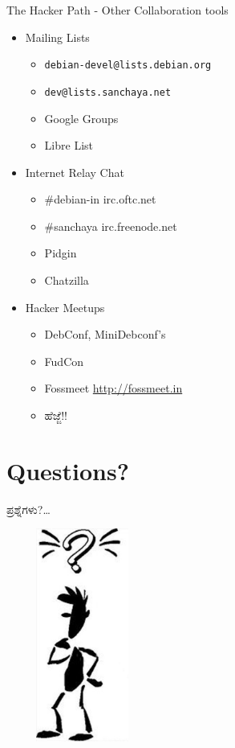 \documentclass[slidestop,compress,brown]{beamer}
\newcommand\en[1]{{\english #1}}
\begin{document}
\begin{frame}{\en{The Hacker Path - Other Collaboration tools}}
  \begin{itemize}[<+->]
  \item<+-| alert@+> \en{Mailing Lists}
    \begin{itemize}
    \item \en{\texttt{debian-devel@lists.debian.org}}
    \item \en{\texttt{dev@lists.sanchaya.net}}
    \item \en{Google Groups}
    \item \en{Libre List}
    \end{itemize}
  \item<+-| alert@+> \en{Internet Relay Chat}
    \begin{itemize}
    \item \en{\#{}debian-in irc.oftc.net}
    \item \en{\#{}sanchaya irc.freenode.net}
    \item \en{Pidgin}
    \item \en{Chatzilla}
    \end{itemize}
  \item<+-| alert@+> \en{Hacker Meetups}
    \begin{itemize}
      \item \en{DebConf, MiniDebconf's}
      \item \en{FudCon}
      \item \en{Fossmeet \url{http://fossmeet.in}}
      \item ಹೆಜ್ಜೆ!!
    \end{itemize}
  \end{itemize}
\end{frame}

\section{\en{Questions?}}
\begin{frame}{ಪ್ರಶ್ನೆಗಳು?\en{\ldots}}
  \begin{center}
    \includegraphics[width=5cm,height=7cm,keepaspectratio]{who-am-i}
  \end{center}
\end{frame}
\end{document}
